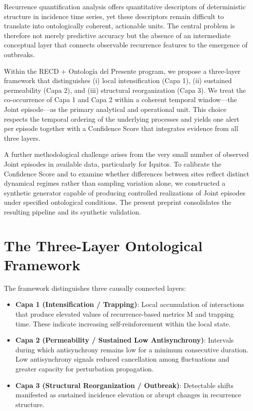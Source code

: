 \documentclass[11pt,a4paper]{article}
\begin{document}
Recurrence quantification analysis offers quantitative descriptors of deterministic structure in incidence time series, yet these descriptors remain difficult to translate into ontologically coherent, actionable units. The central problem is therefore not merely predictive accuracy but the absence of an intermediate conceptual layer that connects observable recurrence features to the emergence of outbreaks.

Within the RECD + Ontología del Presente program, we propose a three-layer framework that distinguishes (i) local intensification (Capa 1), (ii) sustained permeability (Capa 2), and (iii) structural reorganization (Capa 3). We treat the co-occurrence of Capa 1 and Capa 2 within a coherent temporal window—the Joint episode—as the primary analytical and operational unit. This choice respects the temporal ordering of the underlying processes and yields one alert per episode together with a Confidence Score that integrates evidence from all three layers.

A further methodological challenge arises from the very small number of observed Joint episodes in available data, particularly for Iquitos. To calibrate the Confidence Score and to examine whether differences between sites reflect distinct dynamical regimes rather than sampling variation alone, we constructed a synthetic generator capable of producing controlled realizations of Joint episodes under specified ontological conditions. The present preprint consolidates the resulting pipeline and its synthetic validation.

\section{The Three-Layer Ontological Framework}

The framework distinguishes three causally connected layers:

\begin{itemize}
    \item \textbf{Capa 1 (Intensification / Trapping)}: Local accumulation of interactions that produce elevated values of recurrence-based metrics M and trapping time. These indicate increasing self-reinforcement within the local state.
    \item \textbf{Capa 2 (Permeability / Sustained Low Antisynchrony)}: Intervals during which antisynchrony remains low for a minimum consecutive duration. Low antisynchrony signals reduced cancellation among fluctuations and greater capacity for perturbation propagation.
    \item \textbf{Capa 3 (Structural Reorganization / Outbreak)}: Detectable shifts manifested as sustained incidence elevation or abrupt changes in recurrence structure.
\end{itemize}
\end{document}
